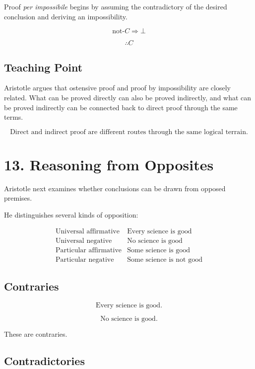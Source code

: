 \documentclass[12pt]{article}
\begin{document}
Proof \textit{per impossibile} begins by assuming the contradictory of the
desired conclusion and deriving an impossibility.

\[
\text{not-}C \Rightarrow \bot
\]

\[
\therefore C
\]

\subsection*{Teaching Point}

Aristotle argues that ostensive proof and proof by impossibility are closely
related. What can be proved directly can also be proved indirectly, and what can
be proved indirectly can be connected back to direct proof through the same
terms.

\[
\boxed{
\text{Direct and indirect proof are different routes through the same logical terrain.}
}
\]

\section*{13. Reasoning from Opposites}

Aristotle next examines whether conclusions can be drawn from opposed premises.

He distinguishes several kinds of opposition:

\[
\begin{array}{ll}
\text{Universal affirmative} & \text{Every science is good} \\
\text{Universal negative} & \text{No science is good} \\
\text{Particular affirmative} & \text{Some science is good} \\
\text{Particular negative} & \text{Some science is not good}
\end{array}
\]

\subsection*{Contraries}

\[
\text{Every science is good.}
\]

\[
\text{No science is good.}
\]

These are contraries.

\subsection*{Contradictories}
\end{document}

